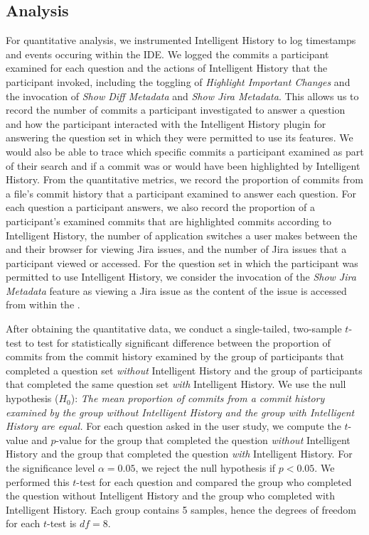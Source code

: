 \subsection{Analysis}
\label{subsec:Analysis}

For quantitative analysis, we instrumented Intelligent History to log timestamps and events occuring within the IDE.
We logged the commits a participant examined for each question and the actions of Intelligent History that the participant invoked,
including the toggling of \textit{Highlight Important Changes} and the invocation of \textit{Show Diff Metadata} and \textit{Show Jira Metadata}.
This allows us to record the number of commits a participant investigated to answer a question and how the participant interacted with the Intelligent History plugin for answering the question set in which they were permitted to use its features.
We would also be able to trace which specific commits a participant examined as part of their search and if a commit was or would have been highlighted by Intelligent History.
From the quantitative metrics, we record the proportion of commits from a file's commit history that a participant examined to answer each question.
For each question a participant answers, we also record the proportion of a participant's examined commits that are highlighted commits according to Intelligent History,
the number of application switches a user makes between the  and their browser for viewing Jira issues,
and the number of Jira issues that a participant viewed or accessed.
For the question set in which the participant was permitted to use Intelligent History, we consider the invocation of the \textit{Show Jira Metadata} feature as viewing a Jira issue
as the content of the issue is accessed from within the .

After obtaining the quantitative data, we conduct a single-tailed, two-sample $t$-test to test for statistically significant difference between the proportion of commits from the commit history examined by the group of participants that completed a question set \emph{without} Intelligent History and the group of participants that completed the same question set \emph{with} Intelligent History.
We use the null hypothesis ($H_{0}$): 
\textit{The mean proportion of commits from a commit history examined by the group without Intelligent History and the group with Intelligent History are equal.}
For each question asked in the user study, we compute the $t$-value and $p$-value for the group that completed the question \emph{without} Intelligent History and the group that completed the question \emph{with} Intelligent History.
For the significance level $\alpha = 0.05$, we reject the null hypothesis if $p < 0.05$.
We performed this $t$-test for each question and compared the group who completed the question without Intelligent History and the group who completed with Intelligent History.
Each group contains 5 samples, hence the degrees of freedom for each $t$-test is $df = 8$.

